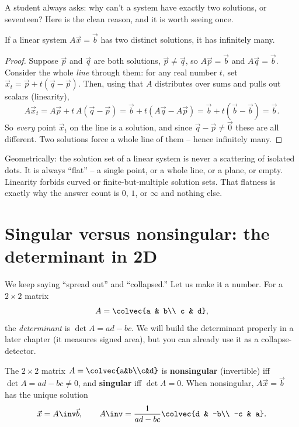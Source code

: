 A student always asks: why can't a system have exactly two solutions, or
seventeen? Here is the clean reason, and it is worth seeing once.

\begin{proposition}
\label{ch06:zoi}
If a linear system $A\vec x=\vec b$ has two distinct solutions, it has
infinitely many.
\end{proposition}

\begin{proof}
Suppose $\vec p$ and $\vec q$ are both solutions, $\vec p\neq\vec q$, so
$A\vec p=\vec b$ and $A\vec q=\vec b$. Consider the whole \emph{line}
through them: for any real number $t$, set
$\vec x_t=\vec p + t(\vec q-\vec p)$. Then, using that $A$ distributes over
sums and pulls out scalars (linearity),
\[
  A\vec x_t = A\vec p + t\,A(\vec q-\vec p)
            = \vec b + t(A\vec q - A\vec p)
            = \vec b + t(\vec b-\vec b) = \vec b.
\]
So \emph{every} point $\vec x_t$ on the line is a solution, and since
$\vec q-\vec p\neq\vec 0$ these are all different. Two solutions force a
whole line of them -- hence infinitely many.
\end{proof}

\begin{intuitionbox}
Geometrically: the solution set of a linear system is never a scattering of
isolated dots. It is always ``flat'' -- a single point, or a whole line, or
a plane, or empty. Linearity forbids curved or finite-but-multiple solution
sets. That flatness is exactly why the answer count is $0$, $1$, or
$\infty$ and nothing else.
\end{intuitionbox}

\section{Singular versus nonsingular: the determinant in 2D}

We keep saying ``spread out'' and ``collapsed.'' Let us make it a number.
For a $2\times 2$ matrix
\[
  A=\colvec{a & b\\ c & d},
\]
the \emph{determinant} is $\det A = ad-bc$. We will build the determinant
properly in a later chapter (it measures signed area), but you can already
use it as a collapse-detector.

\begin{formalbox}
The $2\times 2$ matrix $A=\colvec{a&b\\c&d}$ is \textbf{nonsingular}
(invertible) iff $\det A = ad-bc \neq 0$, and \textbf{singular} iff
$\det A = 0$. When nonsingular, $A\vec x=\vec b$ has the unique solution
\[
  \vec x = A\inv \vec b,\qquad
  A\inv = \frac{1}{ad-bc}\colvec{d & -b\\ -c & a}.
\]
\end{formalbox}

